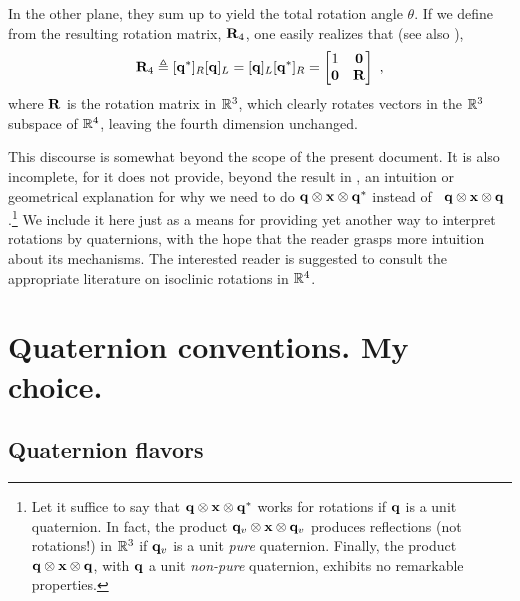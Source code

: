 %
In the other plane, they sum up to yield the total rotation angle $\theta$. 
If we define from   the resulting rotation matrix, ${\bf R}_4$, one easily realizes that (see also ),
%
\begin{align}\label{equ:R4}
{\bf R}_4 \triangleq [{\bf q}^*]_R[{\bf q}]_L=[{\bf q}]_L[{\bf q}^*]_R= \begin{bmatrix}
1 & \bf0 \\
\bf0 & {\bf R}
\end{bmatrix}
~,
\end{align}
%
where ${\bf R}$ is the rotation matrix in ${\mathbb R}^3$, which clearly rotates vectors in the ${\mathbb R}^3$ subspace of ${\mathbb R}^4$, leaving the fourth dimension unchanged.



This discourse is somewhat beyond the scope of the present document. 
It is also incomplete, for it does not provide, beyond the result in , an intuition or geometrical explanation for why we need to do ${\bf q}\otimes{\bf x}\otimes{\bf q}^*$ instead of \eg~${\bf q}\otimes{\bf x}\otimes{\bf q}$.\footnote{Let it suffice to say that ${\bf q}\otimes{\bf x}\otimes{\bf q}^*$ works for rotations if ${\bf q}$ is a unit quaternion. In fact, the product ${\bf q}_v\otimes{\bf x}\otimes{\bf q}_v$ produces reflections (not rotations!) in ${\mathbb R}^3$ if ${\bf q}_v$ is a unit \emph{pure} quaternion. Finally, the product ${\bf q}\otimes{\bf x}\otimes{\bf q}$, with ${\bf q}$ a unit \emph{non-pure} quaternion, exhibits no remarkable properties.}
We include it here just as a means for providing yet another way to interpret rotations by quaternions, with the hope that the reader grasps more intuition about its mechanisms.
The interested reader is suggested to consult the appropriate literature on isoclinic rotations in ${\mathbb R}^4$.






\section{Quaternion conventions. My choice.}
\label{sec:conventions}

\subsection{Quaternion flavors}

